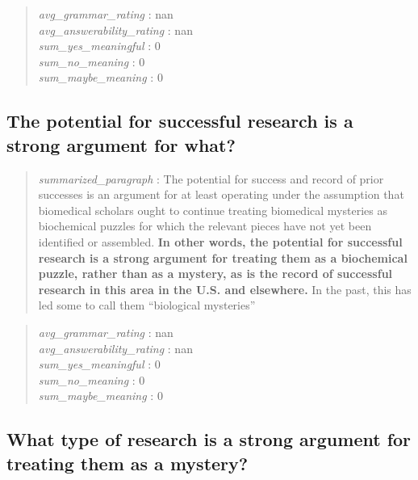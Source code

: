 \begin{quote}
\emph{avg\_grammar\_rating} : nan\\
\emph{avg\_answerability\_rating} : nan\\
\emph{sum\_yes\_meaningful} : 0\\
\emph{sum\_no\_meaning} : 0\\
\emph{sum\_maybe\_meaning} : 0
\end{quote}

\hypertarget{the-potential-for-successful-research-is-a-strong-argument-for-what}{%
\subsection{The potential for successful research is a strong argument
for
what?}\label{the-potential-for-successful-research-is-a-strong-argument-for-what}}

\begin{quote}
\emph{summarized\_paragraph} : The potential for success and record of
prior successes is an argument for at least operating under the
assumption that biomedical scholars ought to continue treating
biomedical mysteries as biochemical puzzles for which the relevant
pieces have not yet been identified or assembled. \textbf{In other
words, the potential for successful research is a strong argument for
treating them as a biochemical puzzle, rather than as a mystery, as is
the record of successful research in this area in the U.S. and
elsewhere.} In the past, this has led some to call them ``biological
mysteries''
\end{quote}

\begin{quote}
\emph{avg\_grammar\_rating} : nan\\
\emph{avg\_answerability\_rating} : nan\\
\emph{sum\_yes\_meaningful} : 0\\
\emph{sum\_no\_meaning} : 0\\
\emph{sum\_maybe\_meaning} : 0
\end{quote}

\hypertarget{what-type-of-research-is-a-strong-argument-for-treating-them-as-a-mystery}{%
\subsection{What type of research is a strong argument for treating them
as a
mystery?}\label{what-type-of-research-is-a-strong-argument-for-treating-them-as-a-mystery}}

